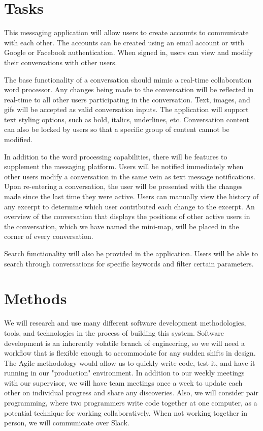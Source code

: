 \documentclass[letterpaper,12pt]{report}
\begin{document}
	\section*{Tasks}
	\markright{}
	This messaging application will allow users to create accounts to
	communicate with each other. The accounts can be created using an email
	account or with Google or Facebook authentication. When signed in, users
	can view and modify their conversations with other users.

	The base functionality of a conversation should mimic a real-time
	collaboration word processor. Any changes being made to the conversation
	will be reflected in real-time to all other users participating in the
	conversation. Text, images, and gifs will be accepted as valid conversation
	inputs. The application will support text styling options, such as bold,
	italics, underlines, etc. Conversation content can also be locked by users
	so that a specific group of content cannot be modified.

	In addition to the word processing capabilities, there will be features to
	supplement the messaging platform.  Users will be notified immediately when
	other users modify a conversation in the same vein as text message
	notifications. Upon re-entering a conversation, the user will be presented
	with the changes made since the last time they were active. Users can
	manually view the history of any excerpt to determine which user
	contributed each change to the excerpt. An overview of the conversation
	that displays the positions of other active users in the conversation, which 
	we have named the mini-map, will be placed in the corner of every 
	conversation.

	Search functionality will also be provided in the application. Users will
	be able to search through conversations for specific keywords and filter
	certain parameters.

	\section*{Methods}
	\markright{}
	We will research and use many different software development methodologies,
	tools, and technologies in the process of building this system. Software
	development is an inherently volatile branch of engineering, so we will
	need a workflow that is flexible enough to accommodate for any sudden shifts
	in design. The Agile methodology would allow us to quickly write code, test
	it, and have it running in our "production" environment. In addition to our
	weekly meetings with our supervisor, we will have team meetings once a week
	to update each other on individual progress and share any discoveries.
	Also, we will consider pair programming, where two programmers write code
	together at one computer, as a potential technique for working
	collaboratively. When not working together in person, we will communicate
	over Slack.
\end{document}
